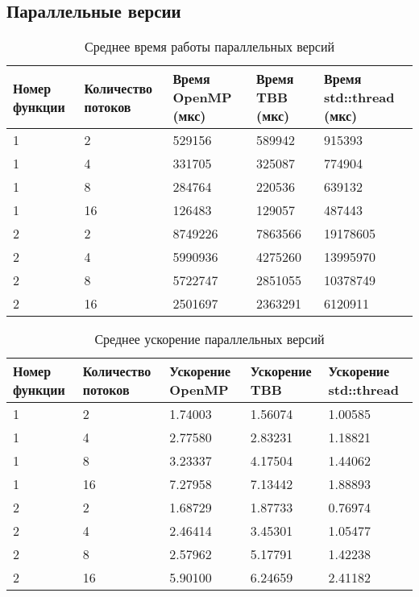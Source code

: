 \documentclass{report}
\begin{document}
\subsection*{Параллельные версии}
\begin{table}[H]
  \centering
  \begin{tabularx}{\textwidth}{|X|X|X|X|X|}
    \hline
    Номер функции & Количество потоков & Время OpenMP (мкс) & Время TBB (мкс) & Время std::thread (мкс) \\
    \hline
    1 & 2  & 529156 & 589942 & 915393 \\
    1 & 4  & 331705 & 325087 & 774904 \\
    1 & 8  & 284764 & 220536 & 639132 \\
    1 & 16 & 126483 & 129057 & 487443 \\
    \hline
    2 & 2  & 8749226 & 7863566 & 19178605 \\
    2 & 4  & 5990936 & 4275260 & 13995970 \\
    2 & 8  & 5722747 & 2851055 & 10378749 \\
    2 & 16 & 2501697 & 2363291 & 6120911  \\
    \hline
  \end{tabularx}
  \caption{Среднее время работы параллельных версий}
\end{table}
\begin{table}[H]
  \centering
  \begin{tabularx}{\textwidth}{|X|X|X|X|X|}
    \hline
    Номер функции & Количество потоков & Ускорение OpenMP & Ускорение TBB & Ускорение std::thread \\
    \hline
    1 & 2  & 1.74003 & 1.56074 & 1.00585 \\
    1 & 4  & 2.77580 & 2.83231 & 1.18821 \\
    1 & 8  & 3.23337 & 4.17504 & 1.44062 \\
    1 & 16 & 7.27958 & 7.13442 & 1.88893 \\
    \hline
    2 & 2  & 1.68729 & 1.87733 & 0.76974 \\
    2 & 4  & 2.46414 & 3.45301 & 1.05477 \\
    2 & 8  & 2.57962 & 5.17791 & 1.42238 \\
    2 & 16 & 5.90100 & 6.24659 & 2.41182 \\
    \hline
  \end{tabularx}
  \caption{Среднее ускорение параллельных версий}
\end{table}

\clearpage
\end{document}
